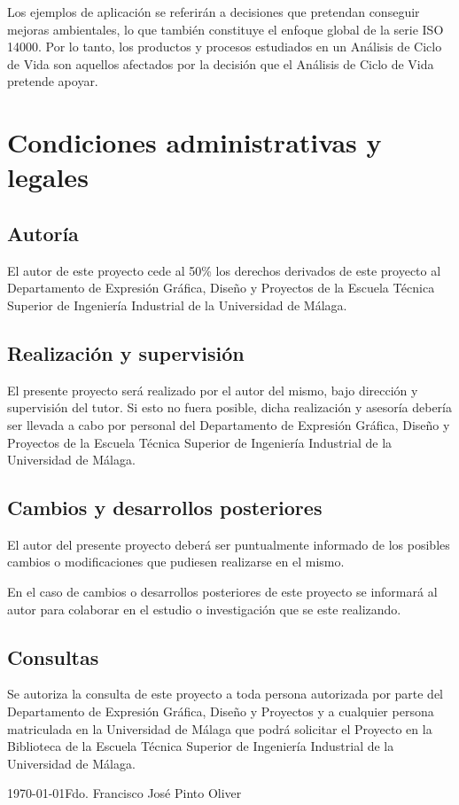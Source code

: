 Los ejemplos de aplicación se referirán a decisiones que pretendan conseguir mejoras ambientales, lo que también constituye el enfoque global de la serie ISO 14000. Por lo tanto, los productos y procesos estudiados en un Análisis de Ciclo de Vida son aquellos afectados por la decisión que el Análisis de Ciclo de Vida pretende apoyar.

\chapter{Condiciones administrativas y legales}

\section{Autoría}
El autor de este proyecto cede al 50\% los derechos derivados de este proyecto al Departamento de Expresión Gráfica, Diseño y Proyectos de la Escuela Técnica Superior de Ingeniería Industrial de la Universidad de Málaga.

\section{Realización y supervisión}
El presente proyecto será realizado por el autor del mismo, bajo dirección y supervisión del tutor. Si esto no fuera posible, dicha realización y asesoría debería ser llevada a cabo por personal del Departamento de Expresión Gráfica, Diseño y Proyectos de la Escuela Técnica Superior de Ingeniería Industrial de la Universidad de Málaga.

\section{Cambios y desarrollos posteriores}
El autor del presente proyecto deberá ser puntualmente informado de los posibles cambios o modificaciones que pudiesen realizarse en el mismo.

En el caso de cambios o desarrollos posteriores de este proyecto se informará al autor para colaborar en el estudio o investigación que se este realizando.

\section{Consultas}
Se autoriza la consulta de este proyecto a toda persona autorizada por parte del Departamento de Expresión Gráfica, Diseño y Proyectos y a cualquier persona matriculada en la Universidad de Málaga que podrá solicitar el Proyecto en la Biblioteca de la Escuela Técnica Superior de Ingeniería Industrial de la Universidad de Málaga.

\vspace{1cm}
\today \hfill Fdo. Francisco José Pinto Oliver

